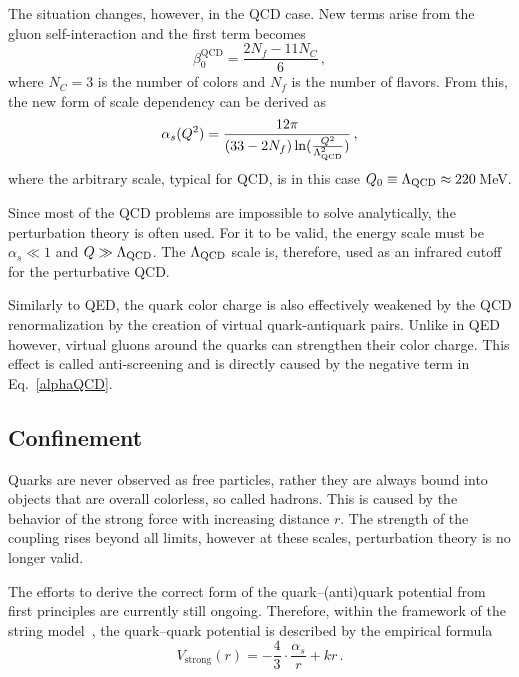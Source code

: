 The situation changes, however, in the QCD case. New terms arise from the gluon self-interaction and the first term becomes
\begin{equation}
 \beta_0^\mathrm{QCD} =  \frac{2N_f - 11N_C}{6}\,,
\end{equation}
where $N_C = 3$ is the number of colors and $N_f$ is the number of flavors. From this, the new form of scale dependency can be derived as 
\begin{equation} \label{alphaQCD}
 \alpha_s(Q^2) = \frac{12\pi}{(33 - 2 N_f) \ln (\frac{Q^2}{\Lambda_\mathrm{QCD}^2})}\,,
\end{equation}
where the arbitrary scale, typical for QCD, is in this case $Q_0 \equiv \Lambda_\mathrm{QCD} \approx 220\,$MeV\@.

Since most of the QCD problems are impossible to solve analytically, the perturbation theory is often used. For it to be valid, the energy scale must be $\alpha_s \ll 1$ and $Q \gg \Lambda_\mathrm{QCD}$\@. The $\Lambda_\mathrm{QCD}$ scale is, therefore, used as an infrared cutoff for the perturbative QCD\@.

Similarly to QED, the quark color charge is also effectively weakened by the QCD renormalization by the creation of virtual quark-antiquark pairs. Unlike in QED however, virtual gluons around the quarks can strengthen their color charge. This effect is called anti-screening and is directly caused by the negative term in Eq.\ \eqref{alphaQCD}\@.






\subsection{Confinement\label{confinement}}

Quarks are never observed as free particles, rather they are always bound into objects that are overall colorless, so called hadrons. This is caused by the behavior of the strong force with increasing distance $r$\@. The strength of the coupling rises beyond all limits, however at these scales, perturbation theory is no longer valid.

The efforts to derive the correct form of the quark--(anti)quark potential from first principles are currently still ongoing. Therefore, within the framework of the string model~\cite{LundString}, the quark--quark potential is described by the empirical formula
\begin{equation} \label{strongV}
 V_\mathrm{strong} (r) = - \frac{4}{3} \cdot \frac{\alpha_s}{r} + kr\,.
\end{equation}

